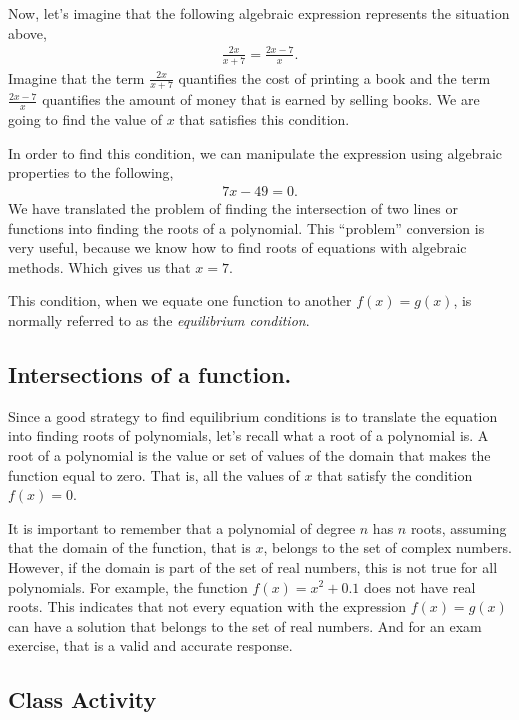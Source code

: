 \documentclass[../main-notes.tex]{subfile}
\begin{document}
Now, let's imagine that the following algebraic expression represents the situation above,
\begin{gather*}
    \frac{2x}{x+7}=\frac{2x-7}{x}.
\end{gather*}
Imagine that the term $\frac{2x}{x+7}$ quantifies the cost of printing a book and the term $\frac{2x-7}{x}$ quantifies the amount of money that is earned by selling books.
We are going to find the value of $x$ that satisfies this condition.

In order to find this condition, we can manipulate the expression using algebraic properties to the following,
\begin{gather*}
    7x-49 = 0.
\end{gather*}
We have translated the problem of finding the intersection of two lines or functions into finding the roots of a polynomial.
This ``problem'' conversion is very useful, because we know how to find roots of equations with algebraic methods.
Which gives us that $x=7$.

This condition, when we equate one function to another $f(x) = g(x)$, is normally referred to as the \emph{equilibrium condition}.

\subsection{Intersections of a function.}

Since a good strategy to find equilibrium conditions is to translate the equation into finding roots of polynomials, let's recall what a root of a polynomial is.
A root of a polynomial is the value or set of values of the domain that makes the function equal to zero.
That is, all the values of $x$ that satisfy the condition $f(x)=0$.

It is important to remember that a polynomial of degree $n$ has $n$ roots, assuming that the domain of the function, that is $x$, belongs to the set of complex numbers.
However, if the domain is part of the set of real numbers, this is not true for all polynomials.
For example, the function $f(x) = x^2+0.1$ does not have real roots.
This indicates that not every equation with the expression $f(x)=g(x)$ can have a solution that belongs to the set of real numbers.
And for an exam exercise, that is a valid and accurate response.

\subsection{Class Activity}
\end{document}
